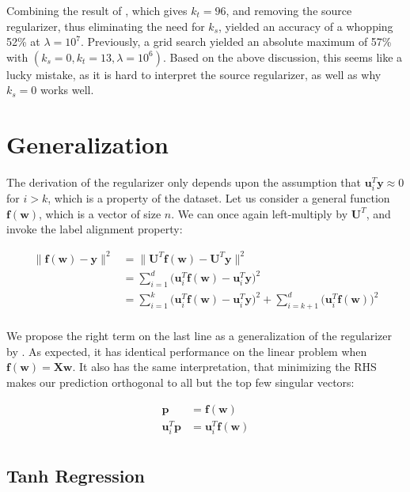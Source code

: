 \documentclass[twoside,11pt]{article}
\begin{document}
Combining the result of \cite{gavish2014optimal}, which gives $k_t = 96$, and removing the source regularizer, thus eliminating the need for $k_s$, yielded an accuracy of a whopping 52\% at $\lambda = 10^7$. Previously, a grid search yielded an absolute maximum of 57\% with $(k_s = 0, k_t = 13, \lambda=10^6)$. Based on the above discussion, this seems like a lucky mistake, as it is hard to interpret the source regularizer, as well as why $k_s = 0$ works well.  

\section{Generalization}

The derivation of the regularizer only depends upon the assumption that $\mathbf{u}_i^T \mathbf{y} \approx 0$ for $i>k$, which is a property of the dataset. Let us consider a general function $\mathbf{f}(\mathbf{w})$, which is a vector of size $n$. We can once again left-multiply by $\mathbf{U}^T$, and invoke the label alignment property:

$$
\begin{aligned}
\lVert \mathbf{f} (\mathbf{w}) - \mathbf{y} \rVert^2 &= \lVert \mathbf{U}^T\mathbf{f} (\mathbf{w}) - \mathbf{U}^T\mathbf{y} \rVert^2 \\
&= \sum_{i=1}^d \bigl( \mathbf{u}_i^T \mathbf{f} (\mathbf{w}) - \mathbf{u}_i^T \mathbf{y} \bigr)^2 \\
&= \sum_{i=1}^k \bigl( \mathbf{u}_i^T \mathbf{f} (\mathbf{w}) - \mathbf{u}_i^T \mathbf{y} \bigr)^2 + \sum_{i=k+1}^d \bigl( \mathbf{u}_i^T \mathbf{f} (\mathbf{w}) \bigr)^2 \\
\end{aligned}
$$

We propose the right term on the last line as a generalization of the regularizer by \cite{imani2022label}. As expected, it has identical performance on the linear problem when $\mathbf{f} (\mathbf{w}) = \mathbf{X w}$. It also has the same interpretation, that minimizing the RHS makes our prediction orthogonal to all but the top few singular vectors:

$$
\begin{aligned}
  \mathbf{p} &= \mathbf{f} (\mathbf{w}) \\
  \mathbf{u}_i^T \mathbf{p} &= \mathbf{u}_i^T \mathbf{f} (\mathbf{w}) \\
\end{aligned}
$$

\subsection{Tanh Regression}
\end{document}
